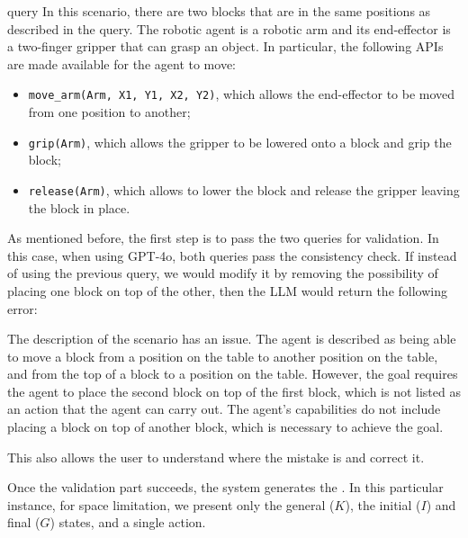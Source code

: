 \begin{textbox}{\LL query}
\footnotesize
In this scenario, there are two blocks that are in the same positions as described in the \HL query. The robotic agent is a robotic arm and its end-effector is a two-finger gripper that can grasp an object. In particular, the following APIs are made available for the agent to move:
\begin{itemize}
    \item \texttt{move\_arm(Arm, X1, Y1, X2, Y2)}, which allows the end-effector to be moved from one position to another;
    \item \texttt{grip(Arm)}, which allows the gripper to be lowered onto a block and grip the block;
    \item \texttt{release(Arm)}, which allows to lower the block and release the gripper leaving the block in place.
\end{itemize}
\end{textbox}


As mentioned before, the first step is to pass the two queries for validation. In this case, when using GPT-4o, both queries pass the consistency check. If instead of using the previous \HL query, we would modify it by removing the possibility of placing one block on top of the other, then the LLM would return the following error:

\begin{textboxerror}
\footnotesize
The description of the scenario has an issue. The agent is described as being able to move a block from a position on the table to another position on the table, and from the top of a block to a position on the table. However, the goal requires the agent to place the second block on top of the first block, which is not listed as an action that the agent can carry out. The agent's capabilities do not include placing a block on top of another block, which is necessary to achieve the goal.
\end{textboxerror}

\noindent This also allows the user to understand where the mistake is and correct it. 

Once the validation part succeeds, the system generates the \HL \kb. In this particular instance, for space limitation, we present only the general \kbase ($K$), the initial ($I$) and final ($G$) states, and a single action. 

